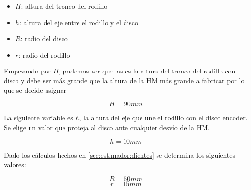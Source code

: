 \documentclass[main_conf.tex]{subfiles}
\begin{document}
\begin{itemize}
\item $H$: altura del tronco del rodillo
\item $h$: altura del eje entre el rodillo y el disco
\item $R$: radio del disco
\item $r$: radio del rodillo
\end{itemize}

Empezando por $H$, podemos ver que las es la altura del tronco
del rodillo con disco y debe ser más grande que la altura de la
HM más grande a fabricar por lo que se decide asignar

$$ H = 90 mm $$

La siguiente variable es $h$, la altura del eje que une el
rodillo con el disco encoder. Se elige un valor que proteja
al disco ante cualquier desvío de la HM.

$$ h = 10 mm $$

Dado los cálculos hechos en \ref{sec:estimador:dientes} se
determina los siguientes valores:

$$ R = 50 mm $$
$$ r = 15 mm $$
\end{document}
